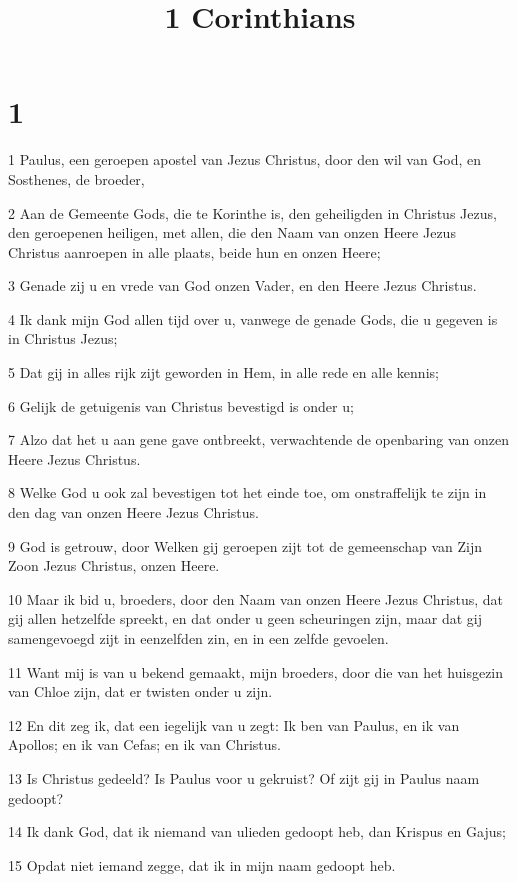 

\title{1 Corinthians}



\chapter{1}

\par 1 Paulus, een geroepen apostel van Jezus Christus, door den wil van God, en Sosthenes, de broeder,
\par 2 Aan de Gemeente Gods, die te Korinthe is, den geheiligden in Christus Jezus, den geroepenen heiligen, met allen, die den Naam van onzen Heere Jezus Christus aanroepen in alle plaats, beide hun en onzen Heere;
\par 3 Genade zij u en vrede van God onzen Vader, en den Heere Jezus Christus.
\par 4 Ik dank mijn God allen tijd over u, vanwege de genade Gods, die u gegeven is in Christus Jezus;
\par 5 Dat gij in alles rijk zijt geworden in Hem, in alle rede en alle kennis;
\par 6 Gelijk de getuigenis van Christus bevestigd is onder u;
\par 7 Alzo dat het u aan gene gave ontbreekt, verwachtende de openbaring van onzen Heere Jezus Christus.
\par 8 Welke God u ook zal bevestigen tot het einde toe, om onstraffelijk te zijn in den dag van onzen Heere Jezus Christus.
\par 9 God is getrouw, door Welken gij geroepen zijt tot de gemeenschap van Zijn Zoon Jezus Christus, onzen Heere.
\par 10 Maar ik bid u, broeders, door den Naam van onzen Heere Jezus Christus, dat gij allen hetzelfde spreekt, en dat onder u geen scheuringen zijn, maar dat gij samengevoegd zijt in eenzelfden zin, en in een zelfde gevoelen.
\par 11 Want mij is van u bekend gemaakt, mijn broeders, door die van het huisgezin van Chloe zijn, dat er twisten onder u zijn.
\par 12 En dit zeg ik, dat een iegelijk van u zegt: Ik ben van Paulus, en ik van Apollos; en ik van Cefas; en ik van Christus.
\par 13 Is Christus gedeeld? Is Paulus voor u gekruist? Of zijt gij in Paulus naam gedoopt?
\par 14 Ik dank God, dat ik niemand van ulieden gedoopt heb, dan Krispus en Gajus;
\par 15 Opdat niet iemand zegge, dat ik in mijn naam gedoopt heb.
